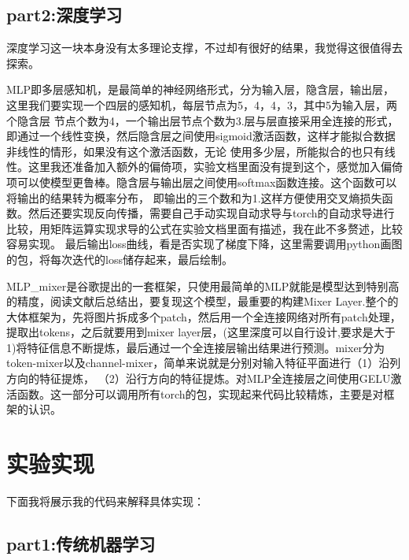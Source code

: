 \documentclass{report}
\begin{document}
    \section{part2:深度学习}
    深度学习这一块本身没有太多理论支撑，不过却有很好的结果，我觉得这很值得去探索。\par 
    MLP即多层感知机，是最简单的神经网络形式，分为输入层，隐含层，输出层，这里我们要实现一个四层的感知机，每层节点为5，4，4，3，其中5为输入层，两个隐含层
    节点个数为4，一个输出层节点个数为3.层与层直接采用全连接的形式，即通过一个线性变换，然后隐含层之间使用sigmoid激活函数，这样才能拟合数据非线性的情形，如果没有这个激活函数，无论
    使用多少层，所能拟合的也只有线性。这里我还准备加入额外的偏倚项，实验文档里面没有提到这个，感觉加入偏倚项可以使模型更鲁棒。隐含层与输出层之间使用softmax函数连接。这个函数可以将输出的结果转为概率分布，
    即输出的三个数和为1.这样方便使用交叉熵损失函数。然后还要实现反向传播，需要自己手动实现自动求导与torch的自动求导进行比较，用矩阵运算实现求导的公式在实验文档里面有描述，我在此不多赘述，比较容易实现。
    最后输出loss曲线，看是否实现了梯度下降，这里需要调用python画图的包，将每次迭代的loss储存起来，最后绘制。\par 
    MLP\_mixer是谷歌提出的一套框架，只使用最简单的MLP就能是模型达到特别高的精度，阅读文献后总结出，要复现这个模型，最重要的构建Mixer Layer.整个的大体框架为，先将图片拆成多个patch，然后用一个全连接网络对所有patch处理，
    提取出tokens，之后就要用到mixer layer层，(这里深度可以自行设计,要求是大于1)将特征信息不断提炼，最后通过一个全连接层输出结果进行预测。mixer分为token-mixer以及channel-mixer，简单来说就是分别对输入特征平面进行（1）沿列方向的特征提炼，
    （2）沿行方向的特征提炼。对MLP全连接层之间使用GELU激活函数。这一部分可以调用所有torch的包，实现起来代码比较精炼，主要是对框架的认识。\par 

    \chapter{实验实现}
    下面我将展示我的代码来解释具体实现：
    \section{part1:传统机器学习}
\end{document}
